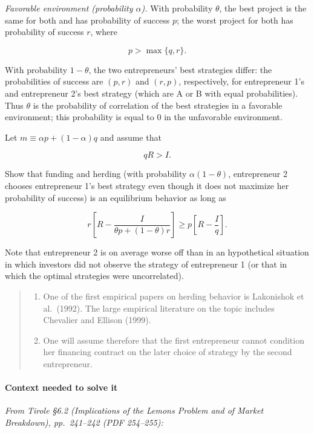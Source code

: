 \documentclass[11pt,a4paper]{article}
\begin{document}
\emph{Favorable environment (probability \(\alpha\)).} With probability \(\theta\), the best project
is the same for both and has probability of success \(p\); the worst project for both has
probability of success \(r\), where

\[p > \max\{q, r\}.\]

With probability \(1 - \theta\), the two entrepreneurs' best strategies differ: the probabilities of
success are \((p, r)\) and \((r, p)\), respectively, for entrepreneur 1's and entrepreneur 2's best
strategy (which are A or B with equal probabilities). Thus \(\theta\) is the probability of
correlation of the best strategies in a favorable environment; this probability is equal to 0 in the
unfavorable environment.

Let \(m \equiv \alpha p + (1 - \alpha)q\) and assume that

\[qR > I.\]

Show that funding and herding (with probability \(\alpha(1 - \theta)\), entrepreneur 2 chooses
entrepreneur 1's best strategy even though it does not maximize her probability of success) is an
equilibrium behavior as long as

\[r\left[R - \frac{I}{\theta p + (1 - \theta)r}\right] \geqslant p\left[R - \frac{I}{q}\right].\]

Note that entrepreneur 2 is on average worse off than in an hypothetical situation in which
investors did not observe the strategy of entrepreneur 1 (or that in which the optimal strategies
were uncorrelated).

\begin{quote}
\begin{enumerate}
\def\labelenumi{\arabic{enumi}.}
\setcounter{enumi}{80}
\item
  One of the first empirical papers on herding behavior is Lakonishok et al.~(1992). The large
  empirical literature on the topic includes Chevalier and Ellison (1999).
\item
  One will assume therefore that the first entrepreneur cannot condition her financing contract on
  the later choice of strategy by the second entrepreneur.
\end{enumerate}
\end{quote}

\paragraph{Context needed to solve it}

\emph{From Tirole §6.2 (Implications of the Lemons Problem and of Market Breakdown), pp.~241--242
(PDF 254--255):}
\end{document}
